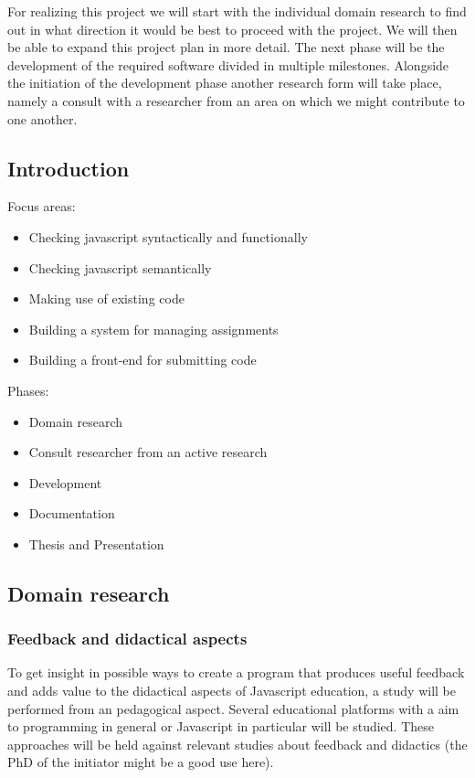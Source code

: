 \documentclass{article}
\begin{document}
For realizing this project we will start with the individual domain research to find out in what direction it would be best to proceed with the project. We will then be able to expand this project plan in more detail. The next phase will be the development of the required software divided in multiple milestones. Alongside the initiation of the development phase another research form will take place, namely a consult with a researcher from an area on which we might contribute to one another.

\subsection{Introduction}


Focus areas:
\begin{itemize}
  \item Checking javascript syntactically and functionally
  \item Checking javascript semantically
  \item Making use of existing code
  \item Building a system for managing assignments
  \item Building a front-end for submitting code
\end{itemize}

Phases:
\begin{itemize}
  \item Domain research
  \item Consult researcher from an active research
  \item Development
  \item Documentation
  \item Thesis and Presentation
\end{itemize}


\subsection{Domain research}

\subsubsection{Feedback and didactical aspects}
To get insight in possible ways to create a program that produces useful feedback and adds value to the didactical aspects of Javascript education, a study will be performed from an pedagogical aspect. Several educational platforms with a aim to programming in general or Javascript in particular will be studied. These approaches will be held against relevant studies about feedback and didactics (the PhD of the initiator might be a good use here).
\end{document}

